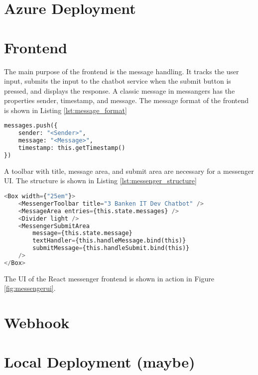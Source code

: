 


\section{Azure Deployment}
\section{Frontend}
The main purpose of the frontend is the message handling.
It tracks the user input, submits the input to the chatbot service 
when the submit button is pressed, 
and displays the response.
A classic message in messangers has the properties sender, timestamp, and message.
The message format of the frontend is shown in Listing \ref{lst:message_format}
\begin{lstlisting}[caption={Message Format}, label={lst:message_format},captionpos=b,frame=single,language={Python},commentstyle=\color{mygreen},keywordstyle=\color{blue},
    morekeywords={}]                
messages.push({
    sender: "<Sender>",
    message: "<Message>",
    timestamp: this.getTimestamp()
})
\end{lstlisting}  
A toolbar with title, message area, and submit area are necessary for a messenger UI.
The structure is shown in Listing \ref{lst:messenger_structure}
\begin{lstlisting}[caption={Messenger Structure}, label={lst:messenger_structure},captionpos=b,frame=single,language={Python},commentstyle=\color{mygreen},keywordstyle=\color{blue},
    morekeywords={MessengerToolbar, MessageArea, Divider, MessengerSubmitArea, Box}]                
<Box width={"25em"}>
    <MessengerToolbar title="3 Banken IT Dev Chatbot" />
    <MessageArea entries={this.state.messages} />
    <Divider light />
    <MessengerSubmitArea 
        message={this.state.message} 
        textHandler={this.handleMessage.bind(this)} 
        submitMessage={this.handleSubmit.bind(this)} 
    />
</Box>
\end{lstlisting}  


The UI of the React messenger frontend is shown in action in Figure \ref{fig:messengerui}.
\section{Webhook}
\section{Local Deployment (maybe)}